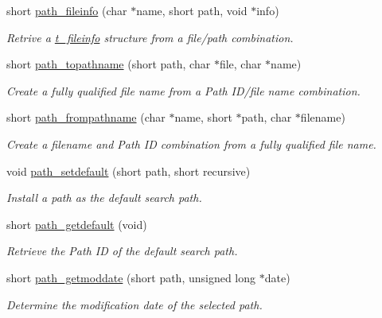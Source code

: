 \begin{DoxyCompactItemize}
short \hyperlink{group__files_gab07291dc4afe564d85e458918da19df1}{path\_\-fileinfo} (char $\ast$name, short path, void $\ast$info)
\begin{DoxyCompactList}\small\item\em Retrive a \hyperlink{structt__fileinfo}{t\_\-fileinfo} structure from a file/path combination. \item\end{DoxyCompactList}\item 
short \hyperlink{group__files_gacfce0e7df61bc36f82c61ff2bbf73ffb}{path\_\-topathname} (short path, char $\ast$file, char $\ast$name)
\begin{DoxyCompactList}\small\item\em Create a fully qualified file name from a Path ID/file name combination. \item\end{DoxyCompactList}\item 
short \hyperlink{group__files_ga8c688029042bf8a21d9f1c87561be8da}{path\_\-frompathname} (char $\ast$name, short $\ast$path, char $\ast$filename)
\begin{DoxyCompactList}\small\item\em Create a filename and Path ID combination from a fully qualified file name. \item\end{DoxyCompactList}\item 
void \hyperlink{group__files_ga57ecd9b35a253cc980f911c7f7c1854b}{path\_\-setdefault} (short path, short recursive)
\begin{DoxyCompactList}\small\item\em Install a path as the default search path. \item\end{DoxyCompactList}\item 
short \hyperlink{group__files_ga6be29f366820a4cd2aa4f77bcfad362e}{path\_\-getdefault} (void)
\begin{DoxyCompactList}\small\item\em Retrieve the Path ID of the default search path. \item\end{DoxyCompactList}\item 
short \hyperlink{group__files_ga6adeb9993cc360ea2e36a47b1a67dd95}{path\_\-getmoddate} (short path, unsigned long $\ast$date)
\begin{DoxyCompactList}\small\item\em Determine the modification date of the selected path. \item\end{DoxyCompactList}\item 

\end{DoxyCompactItemize}
